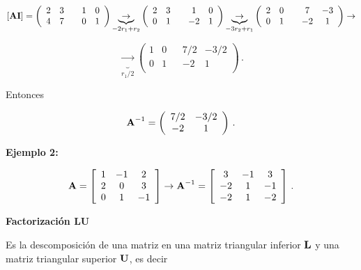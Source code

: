 \documentclass[
]{agujournal2019}
\begin{document}
\[[{\textbf A}  {\textbf I}]=
  \left(
        \begin{array}{ccccc}
  2 & 3 & & 1 & 0\\
  4 & 7 & & 0 & 1\\
        \end{array}
  \right)
  \underbrace{\rightarrow}_{-2r_1+r_2}
  \left(
        \begin{array}{ccccc}
  2 & 3 & & 1 & 0\\
  0 & 1 & & -2 & 1\\
        \end{array}
  \right)
  \underbrace{\rightarrow}_{-3r_2+r_1}
  \left(
        \begin{array}{ccccc}
  2 & 0 & & 7 & -3\\
  0 & 1 & & -2 & 1\\
        \end{array}
  \right)\rightarrow\]

\[\underbrace{\rightarrow}_{r_1/2}
  \left(
        \begin{array}{ccccc}
  1 & 0 & & 7/2 & -3/2\\
  0 & 1 & & -2 & 1\\
        \end{array}
  \right)
  \,.
  \]

Entonces

\[{\textbf A}^{-1}=\left(
        \begin{array}{ccccc}
  7/2 & -3/2\\
  -2 & 1\\
        \end{array}
  \right)\,.\]

\textbf{Ejemplo 2:}

\[{\textbf A}=\left[\begin{array}{cccc}
  1 & -1 & 2\\
  2 & 0 & 3\\
  0 & 1 & -1\\
\end{array}\right]\rightarrow
{\textbf A}^{-1}=\left[\begin{array}{cccc}
  3 & -1 & 3\\
  -2 & 1 & -1\\
  -2 & 1 & -2\\
\end{array}\right]\,.\]

\vspace{0.5cm}

\textbf{Factorización LU}

Es la descomposición de una matriz en una matriz triangular inferior
\({\textbf L}\) y una matriz triangular superior \({\textbf U}\), es
decir
\end{document}
